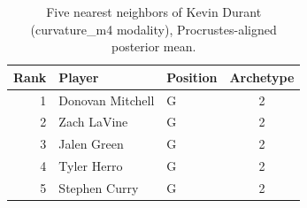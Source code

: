 \begin{table}[htbp]
  \centering\small
  \begin{tabular}{rllc}
    \toprule
    Rank & Player & Position & Archetype \\
    \midrule
    1 & Donovan Mitchell & G & 2 \\
    2 & Zach LaVine & G & 2 \\
    3 & Jalen Green & G & 2 \\
    4 & Tyler Herro & G & 2 \\
    5 & Stephen Curry & G & 2 \\
    \bottomrule
  \end{tabular}
  \caption{Five nearest neighbors of Kevin Durant (curvature_m4 modality), Procrustes-aligned posterior mean.}
  \label{tab:Kevin_Durant_neighbors_curvature_m4}
\end{table}

